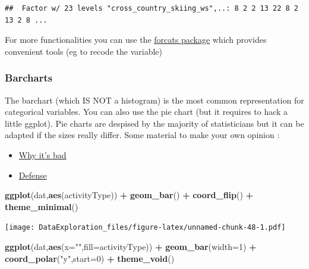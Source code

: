 \documentclass[
]{book}
\newenvironment{Shaded}{\begin{snugshade}}{\end{snugshade}}
\newcommand{\DataTypeTok}[1]{\textcolor[rgb]{0.13,0.29,0.53}{#1}}
\newcommand{\DecValTok}[1]{\textcolor[rgb]{0.00,0.00,0.81}{#1}}
\newcommand{\KeywordTok}[1]{\textcolor[rgb]{0.13,0.29,0.53}{\textbf{#1}}}
\newcommand{\NormalTok}[1]{#1}
\newcommand{\OperatorTok}[1]{\textcolor[rgb]{0.81,0.36,0.00}{\textbf{#1}}}
\newcommand{\StringTok}[1]{\textcolor[rgb]{0.31,0.60,0.02}{#1}}
\providecommand{\tightlist}{%
  \setlength{\itemsep}{0pt}\setlength{\parskip}{0pt}}
\begin{document}
\begin{verbatim}
##  Factor w/ 23 levels "cross_country_skiing_ws",..: 8 2 2 13 22 8 2 13 2 8 ...
\end{verbatim}

For more functionalities you can use the \href{https://cran.r-project.org/web/packages/forcats/vignettes/forcats.html}{forcats package} which provides convenient tools (eg to recode the variable)

\hypertarget{barcharts}{%
\subsubsection{Barcharts}\label{barcharts}}

The barchart (which IS NOT a histogram) is the most common representation for categorical variables. You can also use the pie chart (but it requires to hack a little ggplot).
Pie charts are despised by the majority of statisticians but it can be adapted if the sizes really differ. Some material to make your own opinion :

\begin{itemize}
\tightlist
\item
  \href{https://www.data-to-viz.com/caveat/pie.html}{Why it's bad}
\item
  \href{https://www.oreilly.com/content/in-defense-of-the-pie-chart/}{Defense}
\end{itemize}

\begin{Shaded}
\begin{Highlighting}[]
\KeywordTok{ggplot}\NormalTok{(dat,}\KeywordTok{aes}\NormalTok{(activityType)) }\OperatorTok{+}\StringTok{ }\KeywordTok{geom_bar}\NormalTok{() }\OperatorTok{+}\StringTok{ }\KeywordTok{coord_flip}\NormalTok{() }\OperatorTok{+}\StringTok{ }\KeywordTok{theme_minimal}\NormalTok{()}
\end{Highlighting}
\end{Shaded}

\texttt{[image: DataExploration\_files/figure-latex/unnamed-chunk-48-1.pdf]}

\begin{Shaded}
\begin{Highlighting}[]
\KeywordTok{ggplot}\NormalTok{(dat,}\KeywordTok{aes}\NormalTok{(}\DataTypeTok{x=}\StringTok{""}\NormalTok{,}\DataTypeTok{fill=}\NormalTok{activityType)) }\OperatorTok{+}\StringTok{ }
\StringTok{  }\KeywordTok{geom_bar}\NormalTok{(}\DataTypeTok{width=}\DecValTok{1}\NormalTok{) }\OperatorTok{+}\StringTok{ }
\StringTok{  }\KeywordTok{coord_polar}\NormalTok{(}\StringTok{"y"}\NormalTok{,}\DataTypeTok{start=}\DecValTok{0}\NormalTok{) }\OperatorTok{+}\StringTok{ }
\StringTok{  }\KeywordTok{theme_void}\NormalTok{()}
\end{Highlighting}
\end{Shaded}
\end{document}
